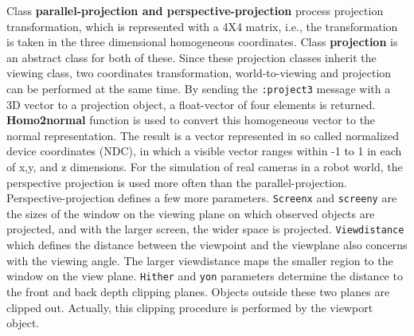 Class {\bf parallel-projection and perspective-projection} process
projection transformation, which is represented with a 4X4 matrix,
i.e., the transformation is taken in the three dimensional homogeneous
coordinates.
Class {\bf projection} is an abstract class for both of these.
Since these projection classes inherit the viewing class,
two coordinates transformation, world-to-viewing and projection
can be performed at the same time.
By sending the {\tt  :project3} message with a 3D vector to a projection object,
a float-vector of four elements is returned.
{\bf Homo2normal} function is used to convert this homogeneous vector
to the normal representation.
The result is a vector represented in so called normalized device coordinates
(NDC), in which a visible vector ranges within -1 to 1
in each of x,y, and z dimensions.
For the simulation of real cameras in a robot world,
the perspective projection is used more often than the parallel-projection.
Perspective-projection defines a few more parameters.
{\tt Screenx} and {\tt screeny} are the sizes of the window on the
viewing plane on which observed objects are projected,
and with the larger screen, the wider space is projected.
{\tt Viewdistance} which defines the distance between the viewpoint
and the viewplane also concerns with the viewing angle.
The larger viewdistance maps the smaller region to the window on the view plane.
{\tt Hither} and {\tt yon} parameters determine the distance to the front and back
depth clipping planes.
Objects outside these two planes are clipped out.
Actually, this clipping procedure is performed by the viewport object.

